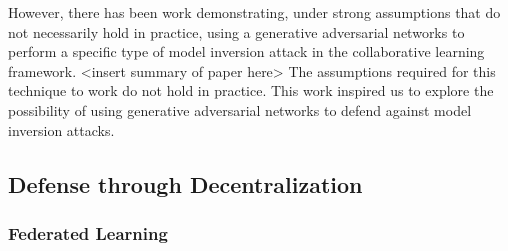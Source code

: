 However, there has been work demonstrating, under strong assumptions that do not necessarily hold in practice, using a generative adversarial networks to perform a specific type of model inversion attack in the collaborative learning framework. <insert summary of paper here>
The assumptions required for this technique to work do not hold in practice. This work inspired us to explore the possibility of using generative adversarial networks to defend against model inversion attacks.

\subsection{Defense through Decentralization}
\subsubsection{Federated Learning}